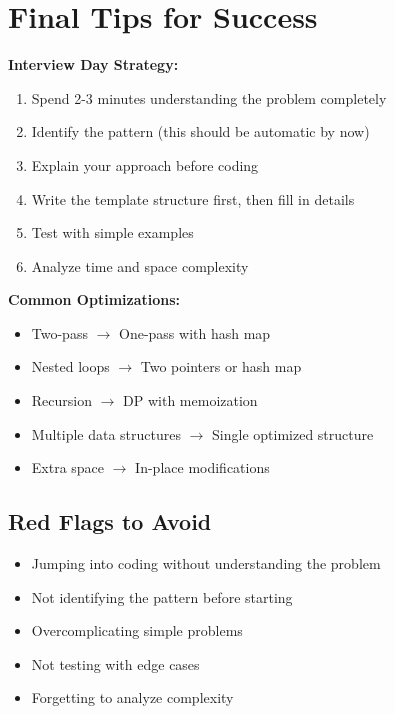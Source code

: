 \documentclass[10pt,a4paper]{article}
\begin{document}
\section{Final Tips for Success}

\begin{tipbox}
\textbf{Interview Day Strategy:}
\begin{enumerate}
\item Spend 2-3 minutes understanding the problem completely
\item Identify the pattern (this should be automatic by now)
\item Explain your approach before coding
\item Write the template structure first, then fill in details
\item Test with simple examples
\item Analyze time and space complexity
\end{enumerate}
\end{tipbox}

\begin{complexitybox}
\textbf{Common Optimizations:}
\begin{itemize}
\item Two-pass $\rightarrow$ One-pass with hash map
\item Nested loops $\rightarrow$ Two pointers or hash map
\item Recursion $\rightarrow$ DP with memoization
\item Multiple data structures $\rightarrow$ Single optimized structure
\item Extra space $\rightarrow$ In-place modifications
\end{itemize}
\end{complexitybox}

\subsection{Red Flags to Avoid}
\begin{itemize}
\item Jumping into coding without understanding the problem
\item Not identifying the pattern before starting
\item Overcomplicating simple problems
\item Not testing with edge cases
\item Forgetting to analyze complexity
\end{itemize}
\end{document}

